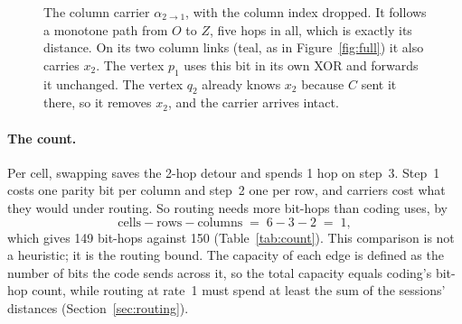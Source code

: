 \documentclass[11pt]{article}
\newcommand{\cx}[1]{\textcolor{xc}{#1}}
\begin{document}
\begin{figure}[t]
\centering
{}
\caption{The column carrier $\alpha_{2\to1}$, with the column index dropped. It follows a monotone path from $O$ to $Z$, five hops in all, which is exactly its distance. On its two column links (\textcolor{colink}{teal}, as in Figure~\ref{fig:full}) it also carries $x_2$. The vertex $p_1$ uses this bit in its own XOR and forwards it unchanged. The vertex $q_2$ already knows $x_2$ because $C$ sent it there, so it removes $x_2$, and the carrier arrives intact.}
\label{fig:carrier}
\end{figure}

\paragraph{The count.} Per cell, swapping saves the 2-hop detour and spends 1 hop on step~3. Step~1 costs one parity bit per column and step~2 one per row, and carriers cost what they would under routing. So routing needs more bit-hops than coding uses, by
\[
\text{cells}-\text{rows}-\text{columns}\;=\;6-3-2\;=\;1,
\]
which gives 149 bit-hops against 150 (Table~\ref{tab:count}). This comparison is not a heuristic; it is the routing bound. The capacity of each edge is defined as the number of bits the code sends across it, so the total capacity equals coding's bit-hop count, while routing at rate~1 must spend at least the sum of the sessions' distances (Section~\ref{sec:routing}).
\end{document}

